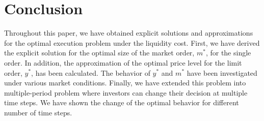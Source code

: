 \documentclass[11pt]{article}
\theoremstyle{plain}
\numberwithin{equation}{section}
\begin{document}
%
%
%
%

\section{Conclusion}
\par Throughout this paper, we have obtained explicit solutions and approximations for the optimal execution problem under the liquidity cost. First, we have derived the explicit solution for the optimal size of the market order, $m^*$, for the single order. In addition, the approximation of the optimal price level for the limit order, $y^*$, has been calculated. The behavior of $y^*$ and $m^*$ have been investigated under various market conditions.  Finally, we have extended this problem into multiple-period problem where investors can change their decision at multiple time steps. We have shown the change of the optimal behavior for different number of time steps.
\end{document}
